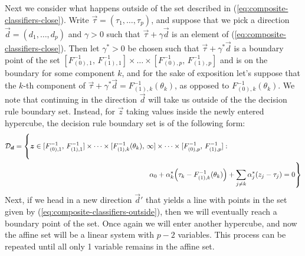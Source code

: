 Next we consider what happens outside of the set described in
(\ref{eq:composite-classifiers-close}).  Write
$\vec{\tau} = (\tau_1, \dots, \tau_p)$, and suppose that we pick a direction
$\vec{d} = (d_1, \dots, d_p)$ and $\gamma > 0$ such that
$\vec{\tau} + \gamma \vec{d}$ is an element of
(\ref{eq:composite-classifiers-close}).  Then let $\gamma^{*} > 0$ be chosen
such that $\vec{\tau} + \gamma^{*} \vec{d}$ is a boundary point of the set
$[F_{(0),1}^{-1},\, F_{(1),1}^{-1}] \times \dots \times [F_{(0),p}^{-1},\,
F_{(1),p}^{-1}]$ and is on the boundary for some component $k$, and for the sake
of exposition let's suppose that the $k$-th component of
$\vec{\tau} + \gamma^{*} \vec{d} = F_{(1),k}^{-1}(\theta_k)$, as opposed to
$F_{(0),k}^{-1}(\theta_k)$.  We note that continuing in the direction $\vec{d}$
will take us outside of the the decision rule boundary set.  Instead, for
$\vec{z}$ taking values inside the newly entered hypercube, the decision rule
boundary set is of the following form:
\begin{equation}
  \label{eq:composite-classifiers-outside}
  \begin{split}
    \mathcal{D}_{\vec{d}} = \left\{
      \vec{z} \in [F_{(0),1}^{-1},\, F_{(1),1}^{-1}]
      \times \dots \times
      [F_{(1),k}^{-1}(\theta_k),\, \infty]
      \times \dots \times
      [F_{(0),p}^{-1},\, F_{(1),p}^{-1}] :
      \phantom{\hspace{30mm} \sum_{j=1}^p}
    \right.  \\
    \left.
      \hfill
      \alpha_0 +
      \alpha_k^{*} \Big(\tau_k - F_{(1),k}^{-1}(\theta_k)\Big) +
      \sum_{j\ne k} \alpha_j^{*} (z_j - \tau_j) = 0
    \right\}
  \end{split}
\end{equation}
Next, if we head in a new direction $\vec{d}'$ that yields a line with points in
the set given by (\ref{eq:composite-classifiers-outside}), then we will
eventually reach a boundary point of the set.  Once again we will enter another
hypercube, and now the affine set will be a linear system with $p - 2$
variables.  This process can be repeated until all only 1 variable remains in
the affine set.

